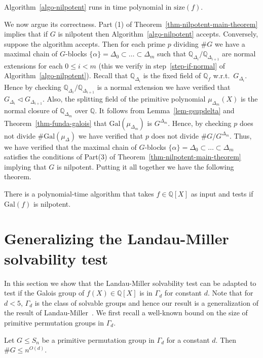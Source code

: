 \documentclass{llncs}
\newcommand{\size}[1]{{\ensuremath{\mathrm{size}\left(#1\right)}}}
\newcommand{\Gal}[1]{{\ensuremath{\mathrm{Gal}\left(#1\right)}}}
\newcommand{\Q}{\ensuremath{\mathbb{Q}}}
\begin{document}
\begin{proposition}
  Algorithm~\ref{algo-nilpotent} runs in time polynomial in
  $\size{f}$.
\end{proposition}

We now argue its correctness. Part (1) of
Theorem~\ref{thm-nilpotent-main-theorem} implies that if $G$ is
nilpotent then Algorithm~\ref{algo-nilpotent} accepts. Conversely,
suppose the algorithm accepts. Then for each prime $p$ dividing $\# G$
we have a maximal chain of $G$-blocks $\{ \alpha \} = \Delta_0 \subset
\ldots \subset \Delta_m$ such that $\Q_{\Delta_i}/\Q_{\Delta_{i+1}}$
are normal extensions for each $0 \leq i < m$ (this we verify in
step~\ref{step-if-normal} of Algorithm~\ref{algo-nilpotent}). Recall
that $\Q_{\Delta_i}$ is the fixed field of $\Q_f$ w.r.t.\
$G_{\Delta_i}$. Hence by checking $\Q_{\Delta_i}/\Q_{\Delta_{i+1}}$ is
a normal extension we have verified that $G_{\Delta_i}\lhd
G_{\Delta_{i+1}}$. Also, the splitting field of the primitive
polynomial $\mu_{\Delta_m}(X)$ is the normal closure of
$\Q_{\Delta_m}$ over $\Q$. It follows from Lemma~\ref{lem-gsupdelta}
and Theorem~\ref{thm-funda-galois} that $\Gal{\mu_{\Delta_m}}$ is
$G^{\Delta_m}$. Hence, by checking $p$ does not divide $\#
\Gal{\mu_\Delta}$ we have verified that $p$ does not divide $\#
G/G^{\Delta_m}$. Thus, we have verified that the maximal chain of
$G$-blocks $\{ \alpha \} = \Delta_0 \subset \ldots \subset \Delta_m$
satisfies the conditions of Part(3) of
Theorem~\ref{thm-nilpotent-main-theorem} implying that $G$ is
nilpotent. Putting it all together we have the following theorem.

\begin{theorem}
  There is a polynomial-time algorithm that takes $f\in\Q[X]$ as input
  and tests if $\Gal{f}$ is nilpotent.
\end{theorem}

\section{Generalizing the Landau-Miller solvability test}

In this section we show that the Landau-Miller solvability test can be
adapted to test if the Galois group of $f(X) \in \Q[X]$ is in
$\Gamma_d$ for constant $d$. Note that for $d < 5$, $\Gamma_d$ is the
class of solvable groups and hence our result is a generalization of
the result of Landau-Miller~\cite{landau85solvability}. We first
recall a well-known bound on the size of primitive permutation groups
in $\Gamma_d$.
\begin{theorem}\label{thm-babai-cameron-palfy}
  Let $G \leq S_n$ be a primitive permutation group in $\Gamma_d$ for
  a constant $d$. Then $\# G \leq n^{O(d)}$.
\end{theorem}
\end{document}
